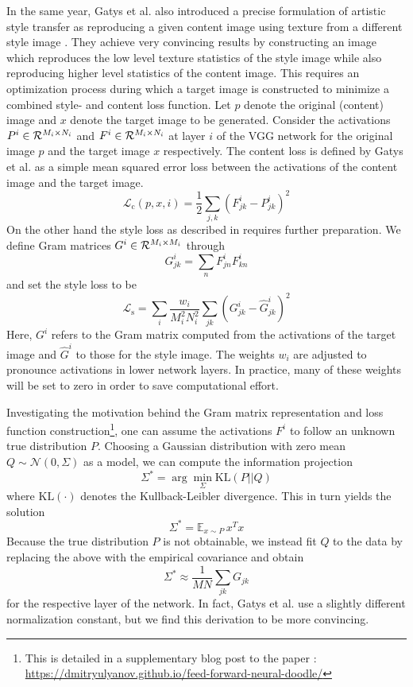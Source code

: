 
In the same year, Gatys et al. also introduced a precise formulation of artistic style transfer as reproducing a given content image using texture from a different style image \cite{gatys2015neural}. They achieve very convincing results by constructing an image which reproduces the low level texture statistics of the style image while also reproducing higher level statistics of the content image. 
This requires an optimization process during which a target image is constructed to minimize a combined style- and content loss function.
Let \(p\) denote the original (content) image and \(x\) denote the target image to be generated. 
Consider the activations \(P^i\in \mathcal{R}^{M_i\times N_i}\) and \(F^i\in \mathcal{R}^{M_i\times N_i}\) at layer \(i\) of the VGG network for the original image \(p\) and the target image \(x\) respectively.
The content loss is defined by Gatys et al. as a simple mean squared error loss between the activations of the content image and the target image.
\[\mathcal{L}_\text{c}(p,x,i) = \frac{1}{2}\sum_{j,k} (F^i_{jk}-P^i_{jk})^2\]
On the other hand the style loss as described in \cite{gatys2015texture} requires further preparation. We define Gram matrices \(G^i\in \mathcal{R}^{M_i\times M_i}\) through
\[G^i_{jk} = \sum_n F^i_{jn}F^i_{kn}\]
and set the style loss to be 
\[\mathcal{L}_\text{s} = \sum_i \frac{w_i}{M_i^2N_i^2} \sum_{jk} (G^i_{jk}-\hat G^i_{jk})^2\]
Here, \(G^i\) refers to the Gram matrix computed from the activations of the target image and \(\hat G^i\) to those for the style image. The weights \(w_i\) are adjusted to pronounce activations in lower network layers. In practice, many of these weights will be set to zero in order to save computational effort.

Investigating the motivation behind the Gram matrix representation and loss function construction\footnote{This is detailed in a supplementary blog post to the paper \cite{ulyanov2016texture}: \url{https://dmitryulyanov.github.io/feed-forward-neural-doodle/}}, one can assume the activations \(F^i\) to follow an unknown true distribution \(P\). Choosing a Gaussian distribution with zero mean \(Q\sim \mathcal{N}(0,\Sigma)\) as a model, we can compute the information projection
\[\Sigma^\ast = \arg\min_\Sigma \text{KL}(P||Q)\]
where \(\text{KL}(\cdot)\) denotes the Kullback-Leibler divergence. This in turn yields the solution
\[\Sigma^\ast = \mathbb{E}_{x\sim P} \,x^Tx\]
Because the true distribution \(P\) is not obtainable, we instead fit \(Q\) to the data by replacing the above with the empirical covariance and obtain
\[\Sigma^\ast \approx \frac{1}{MN} \sum_{jk} G_{jk}\]
for the respective layer of the network. In fact, Gatys et al. use a slightly different normalization constant, but we find this derivation to be more convincing.


